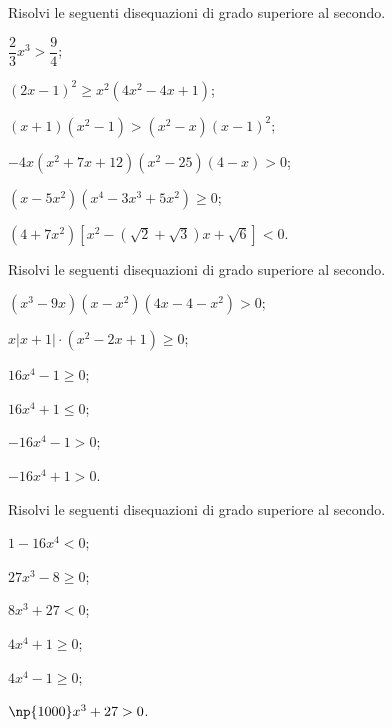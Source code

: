 \begin{esercizio}
 \label{ese:4.54}
Risolvi le seguenti disequazioni di grado superiore al secondo.
\begin{enumeratea}
\item $\dfrac 2 3x^3>\dfrac 9 4$;
\item $ (2x-1)^2\ge x^2\left(4x^2-4x+1\right) $;
\item $ (x+1)\left(x^2-1\right)>\left(x^2-x\right)(x-1)^2 $;
\item $ -4x\left(x^2+7x+12\right)\left(x^2-25\right)(4-x)>0 $;
\item $ (x-5x^2)(x^4-3x^3+5x^2)\ge 0 $;
\item $ (4+7x^2)\left[x^2-(\sqrt 2+\sqrt 3)x+\sqrt 6\right]<0 $.
\end{enumeratea}
\end{esercizio}
\pagebreak
\begin{esercizio}
 \label{ese:4.55}
Risolvi le seguenti disequazioni di grado superiore al secondo.
\begin{multicols}{2}
\begin{enumeratea}
\item $ (x^3-9x)(x-x^2)(4x-4-x^2)>0 $;
\item $ x\left|x+1\right|\cdot (x^2-2x+1)\ge 0 $;
\item $16x^4-1\ge 0$;
\item $16x^4+1\le 0$;
\item $-16x^4-1>0$;
\item $-16x^4+1>0$.
\end{enumeratea}
\end{multicols}
\end{esercizio}

\begin{esercizio}
 \label{ese:4.56}
Risolvi le seguenti disequazioni di grado superiore al secondo.
\begin{multicols}{3}
\begin{enumeratea}
\item $1-16x^4<0$;
\item $27x^3-8\ge 0$;
\item $8x^3+27<0$;
\item $4x^4+1\ge 0$;
\item $4x^4-1\ge 0$;
\item $\np{1000}x^3+27>0$.
\end{enumeratea}
\end{multicols}
\end{esercizio}


